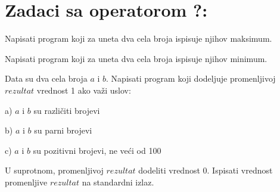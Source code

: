 \section{Zadaci sa operatorom ?:}


\begin{Exercise}[label=p1_17]
Napisati program koji za uneta dva cela broja ispisuje njihov maksimum. 

\end{Exercise}
\begin{Answer}[ref=p1_17]
\end{Answer}

\begin{Exercise}[label=p1_17]
Napisati program koji za uneta dva cela broja ispisuje njihov minimum. 

\end{Exercise}
\begin{Answer}[ref=p1_17]
\end{Answer}


\begin{Exercise}[label=p1_18]
Data su dva cela broja $a$ i $b$. Napisati program koji dodeljuje promenljivoj $rezultat$ vrednost 1
ako važi uslov:
\begin{description}
\item{a)} $a$ i $b$ su različiti brojevi
\item{b)} $a$ i $b$ su parni brojevi
\item{c)} $a$ i $b$ su pozitivni brojevi, ne veći od 100
\end{description} 
U suprotnom, promenljivoj $rezultat$ dodeliti vrednost 0. Ispisati vrednost promenljive $rezultat$ na standardni izlaz. \\


\end{Exercise}
\begin{Answer}[ref=p1_18]
\end{Answer}





